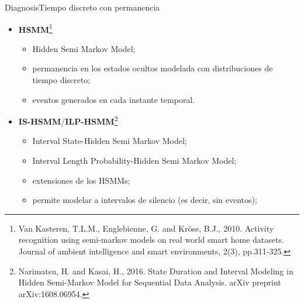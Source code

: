 \documentclass[9pt, handout]{beamer}
\begin{document}
      \begin{frame}{Diagnosis}{Tiempo discreto con permanencia}
        \begin{itemize}
          \pause
          \item \textbf{HSMM}\footnote{Van Kasteren, T.L.M., Englebienne, G. and Kröse, B.J., 2010. Activity recognition using semi-markov models on real world smart home datasets. Journal of ambient intelligence and smart environments, 2(3), pp.311-325.}
          \begin{itemize}
            \item Hidden Semi Markov Model;
            \item permanencia en los estados ocultos modelada con distribuciones de tiempo discreto;
            \item eventos generados en cada instante temporal.
          \end{itemize}
          \pause
          \item \textbf{IS-HSMM}/\textbf{ILP-HSMM}\footnote{Narimatsu, H. and Kasai, H., 2016. State Duration and Interval Modeling in Hidden Semi-Markov Model for Sequential Data Analysis. arXiv preprint arXiv:1608.06954.}
          \begin{itemize}
            \item Interval State-Hidden Semi Markov Model;
            \item Interval Length Probability-Hidden Semi Markov Model;
            \item extensiones de los HSMMs;
            \item permite modelar a intervalos de silencio (es decir, sin eventos);
          \end{itemize}
        \end{itemize}
      \end{frame}
      
\end{document}
